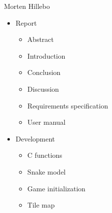 \documentclass{acm_proc_article-sp}
\begin{document}
Morten Hillebo
\begin{itemize}
	\item Report
	\begin{itemize}
		\item Abstract
		\item Introduction
		\item Conclusion
		\item Discussion
		\item Requirements specification
		\item User manual
	\end{itemize}
	\item Development
	\begin{itemize}
		\item C functions
		\item Snake model
		\item Game initialization
		\item Tile map
	\end{itemize}
\end{itemize}


\end{document}
